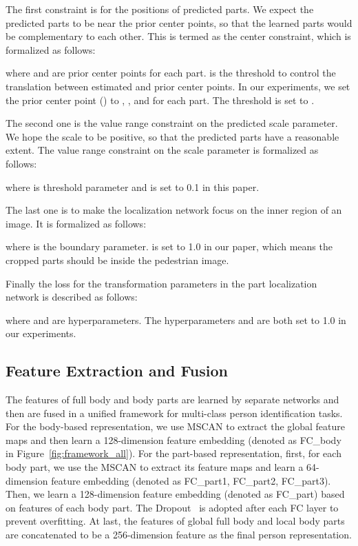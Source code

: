 \documentclass[10pt,twocolumn,letterpaper]{article}
\begin{document}
The first constraint is for the positions of predicted parts.
We expect the predicted parts to be near the prior center points, so that the learned parts would be complementary to each other.
This is termed as the center constraint, which is formalized as follows:

where  and  are prior center points for each part.
 is the threshold to control the translation between estimated and prior center points.
In our experiments, we set the prior center point () to , , and  for each part. The threshold  is set to .

The second one is the value range constraint on the predicted scale parameter.
We hope the scale to be positive, so that the predicted parts have a reasonable extent.
The value range constraint on the scale parameter is formalized as follows:

where  is threshold parameter and is set to 0.1 in this paper.

The last one is to make the localization network focus on the inner region of an image.
It is formalized as follows:

where  is the boundary parameter.  is set to 1.0 in our paper, which means the cropped parts should be inside the pedestrian image.

Finally the loss for the transformation parameters in the part localization network is described as follows:

where  and  are hyperparameters.
The hyperparameters  and  are both set to 1.0 in our experiments.


\subsection{Feature Extraction and Fusion}
\label{FeatureFusion}
The features of full body and body parts are learned by separate networks and then are fused in a unified framework for multi-class person identification tasks.
For the body-based representation, we use MSCAN to extract the global feature maps and then learn a 128-dimension feature embedding (denoted as FC\_body in Figure~\ref{fig:framework_all}).
For the part-based representation, first, for each body part, we use the MSCAN to extract its feature maps and learn a 64-dimension feature embedding (denoted as FC\_part1, FC\_part2, FC\_part3).
Then, we learn a 128-dimension feature embedding (denoted as FC\_part) based on features of each body part.
The Dropout~\cite{srivastava2014dropout} is adopted after each FC layer to prevent overfitting.
At last, the features of global full body and local body parts are concatenated to be a 256-dimension feature as the final person representation.
\end{document}
